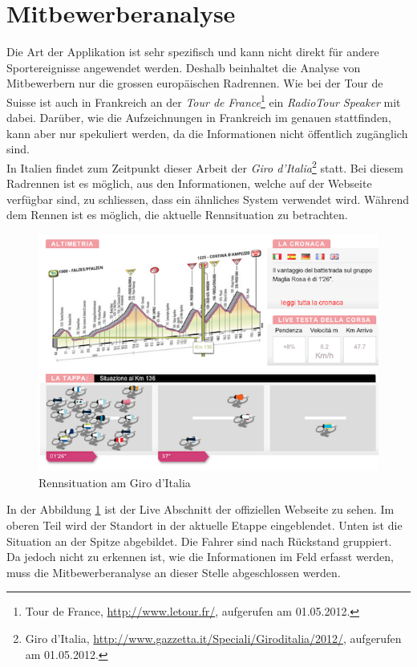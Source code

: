\section{Mitbewerberanalyse}
Die Art der Applikation ist sehr spezifisch und kann nicht direkt für andere Sportereignisse angewendet werden. Deshalb beinhaltet die Analyse von Mitbewerbern nur die grossen europäischen Radrennen. Wie bei der Tour de Suisse ist auch in Frankreich an der \textit{Tour de France}\footnote{Tour de France, \url{http://www.letour.fr/}, aufgerufen am 01.05.2012.} ein \textit{RadioTour Speaker} mit dabei. Darüber, wie die Aufzeichnungen in Frankreich im genauen stattfinden, kann aber nur spekuliert werden, da die Informationen nicht öffentlich zugänglich sind.
\\

In Italien findet zum Zeitpunkt dieser Arbeit der \textit{Giro d'Italia}\footnote{Giro d'Italia,  \url{http://www.gazzetta.it/Speciali/Giroditalia/2012/}, aufgerufen am 01.05.2012.} statt. Bei diesem Radrennen ist es möglich, aus den Informationen, welche auf der Webseite verfügbar sind, zu schliessen, dass ein ähnliches System verwendet wird. Während dem Rennen ist es möglich, die aktuelle Rennsituation zu betrachten.

\begin{figure}[h!]
\caption{Rennsituation am Giro d'Italia}
\label{fig:giro}
\includegraphics[scale=0.6]{05bericht/images/giro.png}
\end{figure} 

In der Abbildung \ref{fig:giro} ist der Live Abschnitt der offiziellen Webseite zu sehen. Im oberen Teil wird der Standort in der aktuelle Etappe eingeblendet. Unten ist die Situation an der Spitze abgebildet. Die Fahrer sind nach Rückstand gruppiert.
\\

Da jedoch nicht zu erkennen ist, wie die Informationen im Feld erfasst werden, muss die Mitbewerberanalyse an dieser Stelle abgeschlossen werden.